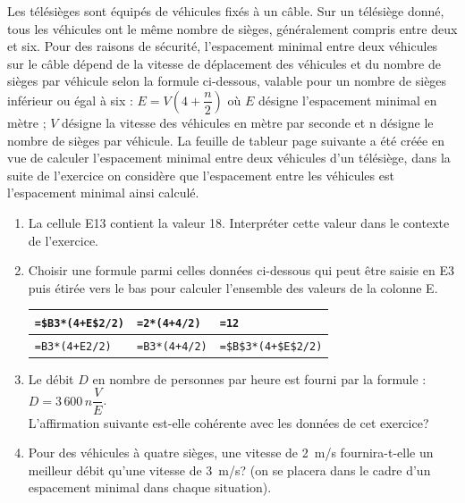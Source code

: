\begin{exercice}[CRPE 2016 G2] %
   Les télésièges sont équipés de véhicules fixés à un câble. Sur un télésiège donné, tous les véhicules ont le même nombre de sièges, généralement compris entre deux et six. Pour des raisons de sécurité, l'espacement minimal entre deux véhicules sur le câble dépend de la vitesse de déplacement des véhicules et du nombre de sièges par véhicule selon la formule ci-dessous, valable pour un nombre de sièges inférieur ou égal à six : $E =V\left(4+\dfrac{n}{2}\right)$ où $E$ désigne l'espacement minimal en mètre ; $V$ désigne la vitesse des véhicules en mètre par seconde et n désigne le nombre de sièges par véhicule. La feuille de tableur page suivante a été créée en vue de calculer l'espacement minimal entre deux véhicules d'un télésiège, dans la suite de l'exercice on considère que l'espacement entre les véhicules est l'espacement minimal ainsi calculé.
   \begin{enumerate}
      \item La cellule E13 contient la valeur 18. Interpréter cette valeur dans le contexte de l'exercice.
      \item Choisir une formule parmi celles données ci-dessous qui peut être saisie en E3 puis étirée vers le bas pour calculer l'ensemble des valeurs de la colonne E. \medskip
      \begin{center}
         {
         \begin{tabular}{|p{3cm}|p{3cm}|p{3cm}|}
            \hline
            \texttt{=\$B3*(4+E\$2/2)} & \texttt{=2*(4+4/2)} & \texttt{=12} \\
            \hline
            \texttt{=B3*(4+E2/2)} & \texttt{=B3*(4+4/2)} & \texttt{=\$B\$3*(4+\$E\$2/2)} \\
            \hline
         \end{tabular}
         }
      \end{center} \smallskip
      \item Le débit $D$ en nombre de personnes par heure est fourni par la formule : $D =3\,600\,n\dfrac{V}{E}$. \\
         L'affirmation suivante est-elle cohérente avec les données de cet exercice? \\
          \fg
      \item Pour des véhicules à quatre sièges, une vitesse de 2~m/s fournira-t-elle un meilleur débit qu'une vitesse de 3~m/s? (on se placera dans le cadre d'un espacement minimal dans chaque situation).

\end{enumerate}
\end{exercice}
